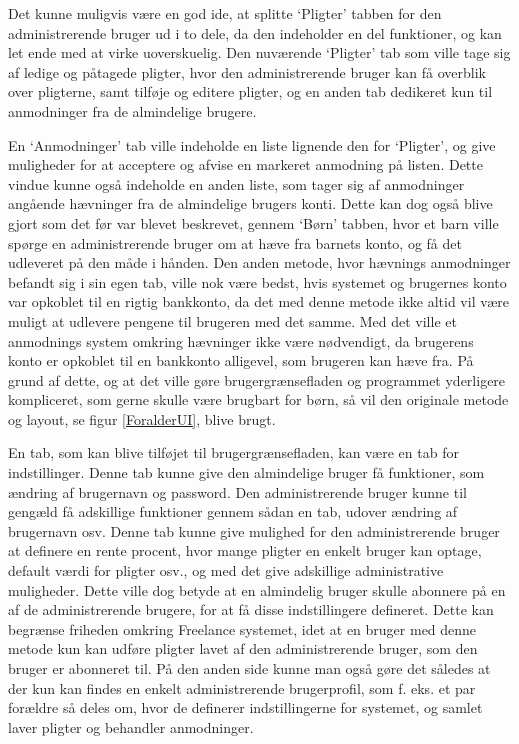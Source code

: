 Det kunne muligvis være en god ide, at splitte ‘Pligter’ tabben for den administrerende bruger ud i to dele, da den indeholder en del funktioner, og kan let ende med at virke uoverskuelig. Den nuværende ‘Pligter’ tab som ville tage sig af ledige og påtagede pligter, hvor den administrerende bruger kan få overblik over pligterne, samt tilføje og editere pligter, og en anden tab dedikeret kun til anmodninger fra de almindelige brugere.

En ‘Anmodninger’ tab ville indeholde en liste lignende den for ‘Pligter’, og give muligheder for at acceptere og afvise en markeret anmodning på listen. Dette vindue kunne også indeholde en anden liste, som tager sig af anmodninger angående hævninger fra de almindelige brugers konti. Dette kan dog også blive gjort som det før var blevet beskrevet, gennem ‘Børn’ tabben, hvor et barn ville spørge en administrerende bruger om at hæve fra barnets konto, og få det udleveret på den måde i hånden. Den anden metode, hvor hævnings anmodninger befandt sig i sin egen tab, ville nok være bedst, hvis systemet og brugernes konto var opkoblet til en rigtig bankkonto, da det med denne metode ikke altid vil være muligt at udlevere pengene til brugeren med det samme. Med det ville et anmodnings system omkring hævninger ikke være nødvendigt, da brugerens konto er opkoblet til en bankkonto alligevel, som brugeren kan hæve fra. På grund af dette, og at det ville gøre brugergrænsefladen og programmet yderligere kompliceret, som gerne skulle være brugbart for børn, så vil den originale metode og layout, se figur \ref{ForalderUI}, blive brugt.

En tab, som kan blive tilføjet til brugergrænsefladen, kan være en tab for indstillinger. Denne tab kunne give den almindelige bruger få funktioner, som ændring af brugernavn og password. Den administrerende bruger kunne til gengæld få adskillige funktioner gennem sådan en tab, udover ændring af brugernavn osv. Denne tab kunne give mulighed for den administrerende bruger at definere en rente procent, hvor mange pligter en enkelt bruger kan optage, default værdi for pligter osv., og med det give adskillige administrative muligheder. Dette ville dog betyde at en almindelig bruger skulle abonnere på en af de administrerende brugere, for at få disse indstillingere defineret. Dette kan begrænse friheden omkring Freelance systemet, idet at en bruger med denne metode kun kan udføre pligter lavet af den administrerende bruger, som den bruger er abonneret til. På den anden side kunne man også gøre det således at der kun kan findes en enkelt administrerende brugerprofil, som f. eks. et par forældre så deles om, hvor de definerer indstillingerne for systemet, og samlet laver pligter og behandler anmodninger.